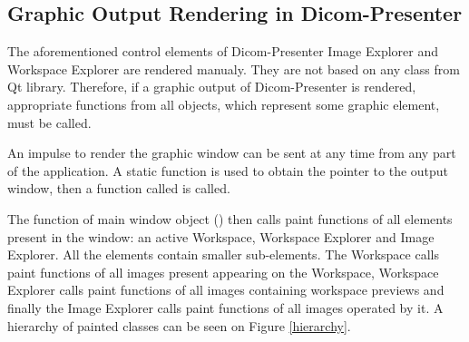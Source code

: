 \subsection{Graphic Output Rendering in Dicom-Presenter}
\label{renderingprocess}
The aforementioned control elements of Dicom-Presenter Image Explorer and Workspace Explorer are rendered manualy. They are not based on any class from Qt library. Therefore, if a graphic output of Dicom-Presenter is rendered, appropriate functions from all objects, which represent some graphic element, must be called. 

An impulse to render the graphic window can be sent at any time from any part of the application. A static function is used to obtain the pointer to the output window, then a function called  is called.

The  function of main window object () then calls paint functions of all elements present in the window: an active Workspace, Workspace Explorer and Image Explorer. All the elements contain smaller sub-elements. The Workspace calls paint functions of all images present appearing on the Workspace, Workspace Explorer calls paint functions of all images containing workspace previews and finally the Image Explorer calls paint functions of all images operated by it. A hierarchy of painted classes can be seen on Figure \ref{hierarchy}.

